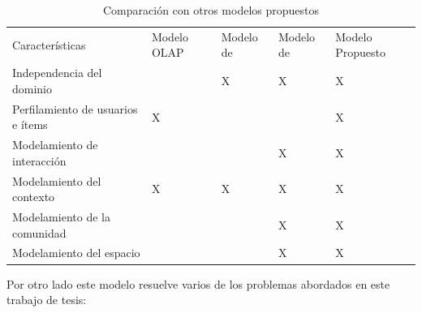\begin{table}[H]
\caption{Comparación con otros modelos propuestos}
\label{tabla:comparacionotrosmodelos}
\begin{center}
	\begin{tabular}{|>{\centering\arraybackslash}p{3cm}  | >{\centering\arraybackslash}p{2cm}  |>{\centering\arraybackslash}p{2cm} |>{\centering\arraybackslash}p{2cm} |>{\centering\arraybackslash}p{2cm} |}
	\hline	& \multicolumn{4}{c|}{Modelos} \\	
	
	\hline Características	 				 				& Modelo OLAP \cite{Adomavicius:2001}  & Modelo de \cite{Babar:2010} & Modelo de \cite{Palomino:2012} & Modelo Propuesto \\ 
	\hline Independencia del dominio 		 				&   & X & X & X  \\ 
	\hline Perfilamiento de usuarios e ítems 				& X &   &   & X \\ 
	\hline Modelamiento de interacción 						&   &   & X & X \\ 
	\hline Modelamiento del contexto						& X & X & X & X \\ 
	\hline Modelamiento de la comunidad 					&   &   & X & X \\ 
	\hline Modelamiento del espacio					 		&   &   & X & X \\ 
	\hline 
	\end{tabular} 
\end{center}
\end{table}

Por otro lado este modelo resuelve varios de los problemas abordados en este trabajo de tesis:

